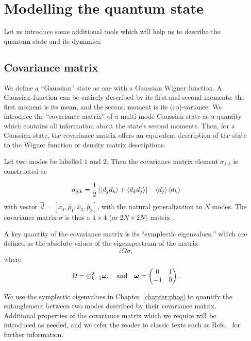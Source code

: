 \FloatBarrier
\section{Modelling the quantum state}
Let us introduce some additional tools which will help us to describe the quantum state and its dynamics.


\FloatBarrier
\subsection{Covariance matrix}
We define a ``Gaussian'' state as one with a Gaussian Wigner function. A Gaussian function can be entirely described by its first and second moments; the first moment is its mean, and the second moment is its (co)-variance. We introduce the ``covariance matrix'' of a multi-mode Gaussian state as a quantity which contains all information about the state's second moments. Then, for a Gaussian state, the covariance matrix offers an equivalent description of the state to the Wigner function or density matrix descriptions. 


Let two modes be labelled $1$ and $2$. Then the covariance matrix element $\sigma_{j, k}$ is constructed as

\begin{equation}\label{eqn:intro_covariancematrix}
\sigma_{j, k} = \frac{1}{2} \left[ \ev{d_j d_k} + \ev{d_k d_j}\right] - \ev{d_j} \ev{d_k}
\end{equation}
with vector $\overrightarrow{d} = \left[\hat{x}_1, \hat{p}_1, \hat{x}_2, \hat{p}_2 \right]$, with the natural generalization to $N$ modes. The covariance matrix $\sigma$ is thus a $4 \times 4$ (or $2 N \times 2 N$) matrix . 

A key quantity of the covariance matrix is its ``symplectic eigenvalues,'' which are defined as the absolute values of the eigenspectrum of the matrix
\begin{equation}
i \Omega \sigma,
\end{equation}
where 
\begin{equation}
\Omega = \oplus_{k=1}^2 \bm{\omega}, \qq{and} \bm{\omega} = \pmqty{0 & 1 \\ -1 & 0}.
\end{equation}

\noindent We use the symplectic eigenvalues in Chapter~\ref{chapter:phog} to quantify the entanglement between two modes described by their covariance matrix. Additional properties of the covariance matrix which we require will be introduced as needed, and we refer the reader to classic texts such as Refs.~\cite{Weedbrook2012, Serafini2019} for further information.


